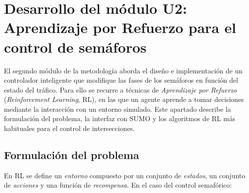 \section{Desarrollo del módulo U2: Aprendizaje por Refuerzo para el control de semáforos}

El segundo módulo de la metodología aborda el diseño e
implementación de un controlador inteligente que modifique las fases
de los semáforos en función del estado del tráfico. Para ello se
recurre a técnicas de \emph{Aprendizaje por Refuerzo} (\emph{Reinforcement
Learning}, RL), en las que un agente aprende a tomar decisiones
mediante la interacción con un entorno simulado. Este apartado
describe la formulación del problema, la interfaz con SUMO y los
algoritmos de RL más habituales para el control de intersecciones.

\subsection*{Formulación del problema}

En RL se define un \emph{entorno} compuesto por un conjunto de
\emph{estados}, un conjunto de \emph{acciones} y una función de
\emph{recompensa}. En el caso del control semafórico:

